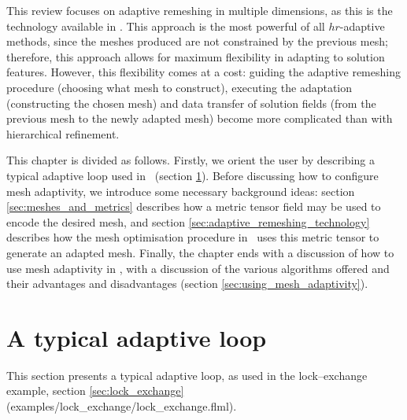 This review focuses on adaptive remeshing in multiple dimensions, as this is
the technology available in \fluidity.
This approach is the most powerful of all $hr$-adaptive methods, since the meshes produced are not constrained
by the previous mesh; therefore, this approach allows for maximum flexibility in
adapting to solution features. However, this flexibility comes
at a cost: guiding the adaptive remeshing procedure (choosing
what mesh to construct), executing the adaptation (constructing
the chosen mesh) and data transfer of solution fields (from the previous mesh to
the newly adapted mesh) become more complicated than with hierarchical refinement.

This chapter is divided as follows. Firstly, we orient the user by describing a typical
adaptive loop used in \fluidity\ (section \ref{sec:typical_adaptive_loop}). Before
discussing how to configure mesh adaptivity, we introduce some necessary background ideas: 
section \ref{sec:meshes_and_metrics} describes how a metric tensor field
may be used to encode the desired mesh, and section \ref{sec:adaptive_remeshing_technology} describes how the
mesh optimisation procedure in \fluidity\ uses this metric tensor to generate an adapted mesh. Finally,
the chapter ends with a discussion of how to use mesh adaptivity in \fluidity, with a discussion
of the various algorithms offered and their advantages and disadvantages (section \ref{sec:using_mesh_adaptivity}).

\section{A typical adaptive loop} \label{sec:typical_adaptive_loop}
This section presents a typical adaptive loop, as used in the lock--exchange example, section \ref{sec:lock_exchange}
(examples/lock\_exchange/lock\_exchange.flml).

